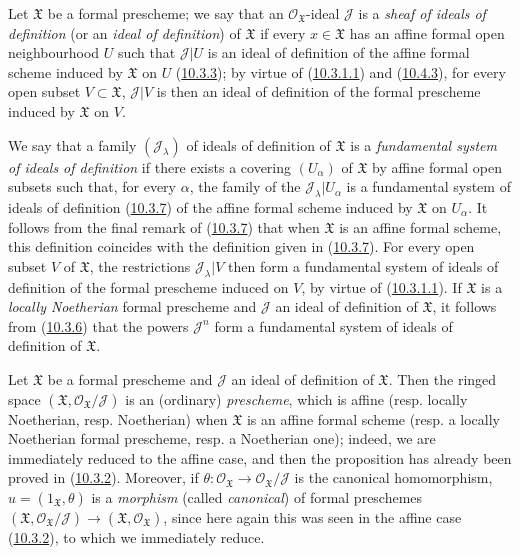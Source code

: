 \begin{env}[10.5.1]
\label{I.10.5.1}
Let $\mathfrak{X}$ be a formal prescheme; we say that an
$\mathscr{O}_{\mathfrak{X}}$-ideal $\mathscr{J}$ is a
\emph{sheaf of ideals of definition} (or an
\emph{ideal of definition}) of $\mathfrak{X}$ if every
$x\in\mathfrak{X}$ has an affine formal open neighbourhood $U$ such that
$\mathscr{J}|U$ is an ideal of definition of the affine formal scheme
induced by $\mathfrak{X}$ on $U$
(\hyperref[I.10.3.3]{10.3.3}); by virtue of
(\hyperref[I.10.3.1.1]{10.3.1.1}) and
(\hyperref[I.10.4.3]{10.4.3}), for every open subset
$V\subset\mathfrak{X}$, $\mathscr{J}|V$ is then an ideal of definition
of the formal prescheme induced by $\mathfrak{X}$ on $V$.

We say that a family $(\mathscr{J}_\lambda)$ of ideals of definition of
$\mathfrak{X}$ is a \emph{fundamental system}
\emph{of ideals of definition} if there exists a covering
$(U_\alpha)$ of $\mathfrak{X}$ by affine formal open subsets such that,
for every $\alpha$, the family of the
$\mathscr{J}_\lambda|U_\alpha$ is a fundamental system of ideals of
definition (\hyperref[I.10.3.7]{10.3.7}) of the affine formal scheme
induced by $\mathfrak{X}$ on $U_\alpha$. It follows from the final remark
of (\hyperref[I.10.3.7]{10.3.7}) that when $\mathfrak{X}$ is an
affine formal scheme, this definition coincides with the definition given
in (\hyperref[I.10.3.7]{10.3.7}). For every open subset $V$ of
$\mathfrak{X}$, the restrictions $\mathscr{J}_\lambda|V$ then form a
fundamental system of ideals of definition of the formal prescheme induced
on $V$, by virtue of (\hyperref[I.10.3.1.1]{10.3.1.1}). If
$\mathfrak{X}$ is a \emph{locally Noetherian} formal prescheme and
$\mathscr{J}$ an ideal of definition of $\mathfrak{X}$, it follows from
(\hyperref[I.10.3.6]{10.3.6}) that the powers $\mathscr{J}^n$
form a fundamental system of ideals of definition of $\mathfrak{X}$.
\end{env}

\begin{env}[10.5.2]
\label{I.10.5.2}
Let $\mathfrak{X}$ be a formal prescheme and $\mathscr{J}$ an ideal of
definition of $\mathfrak{X}$. Then the ringed space
$(\mathfrak{X},\mathscr{O}_{\mathfrak{X}}/\mathscr{J})$ is an (ordinary)
\emph{prescheme}, which is affine (resp. locally Noetherian,
resp. Noetherian) when $\mathfrak{X}$ is an affine formal scheme
(resp. a locally Noetherian formal prescheme, resp. a Noetherian one);
indeed, we are immediately reduced to the affine case, and then the
proposition has already been proved in (\hyperref[I.10.3.2]{10.3.2}).
Moreover, if
$\theta:\mathscr{O}_{\mathfrak{X}}\to
\mathscr{O}_{\mathfrak{X}}/\mathscr{J}$ is the canonical homomorphism,
$u=(1_{\mathfrak{X}},\theta)$ is a \emph{morphism} (called
\emph{canonical}) of formal preschemes
$(\mathfrak{X},\mathscr{O}_{\mathfrak{X}}/\mathscr{J})\to
(\mathfrak{X},\mathscr{O}_{\mathfrak{X}})$, since here again this was seen
in the affine case (\hyperref[I.10.3.2]{10.3.2}), to which we
immediately reduce.
\end{env}

